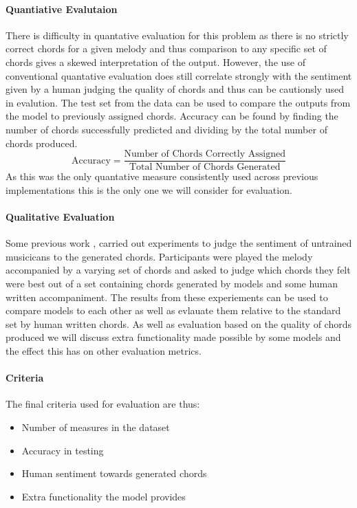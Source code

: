 \paragraph{Quantiative Evalutaion}
There is difficulty in quantative evaluation for this problem as there is no strictly correct chords for a given melody and thus comparison to any specific set of chords gives a skewed interpretation of the output.
However, the use of conventional quantative evaluation does still correlate strongly with the sentiment given by a human judging the quality of chords and thus can be cautionsly used in evalution.
The test set from the data can be used to compare the outputs from the model to previously assigned chords. Accuracy can be found by finding the number of chords successfully predicted and dividing by the total number of chords produced.
\begin{equation}
    \text{Accuracy} = \frac{\text{Number of Chords Correctly Assigned}}{\text{Total Number of Chords Generated}}
\end{equation}
As this was the only quantative measure consistently used across previous implementations this is the only one we will consider for evaluation.

\paragraph{Qualitative Evaluation}
Some previous work \cite{MySong}, \cite{BLSTM} carried out experiments to judge the sentiment of untrained musicicans to the generated chords.
Participants were played the melody accompanied by a varying set of chords and asked to judge which chords they felt were best out of a set containing chords generated by models and some human written accompaniment.
The results from these experiements can be used to compare models to each other as well as evlauate them relative to the standard set by human written chords.
As well as evaluation based on the quality of chords produced we will discuss extra functionality made possible by some models and the effect this has on other evaluation metrics.

\paragraph{Criteria}
The final criteria used for evaluation are thus:
\begin{itemize}
    \item Number of measures in the dataset
    \item Accuracy in testing
    \item Human sentiment towards generated chords
    \item Extra functionality the model provides
\end{itemize}
